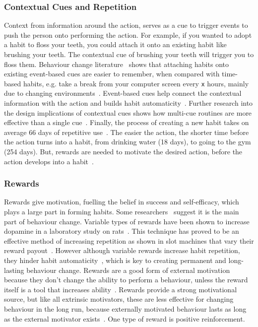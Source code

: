 \subsubsection*{Contextual Cues and Repetition}
Context from information around the action, serves as a cue to trigger events to push the person onto performing the action. For example, if you wanted to adopt a habit to floss your teeth, you could attach it onto an existing habit like brushing your teeth. The contextual cue of brushing your teeth will trigger you to floss them. Behaviour change literature~\cite{article_implementation_intentions_multicue} shows that attaching habits onto existing event-based cues are easier to remember, when compared with time-based habits, e.g. take a break from your computer screen every \verb|x| hours, mainly due to changing environments~\cite{coaching_not_that_good}. Event-based cues help connect the contextual information with the action and builds habit automaticity~\cite{article_implementation_intentions}. Further research into the design implications of contextual cues shows how multi-cue routines are more effective than a single cue~\cite{article_understanding_use_contextual_cues_design_impl}. Finally, the process of creating a new habit takes on average 66 days of repetitive use~\cite{article_how_habits_formed_modelling_habit_formation}. The easier the action, the shorter time before the action turns into a habit, from drinking water (18 days), to going to the gym (254 days). But, rewards are needed to motivate the desired action, before the action develops into a habit~\cite{habits_event_cues_1, habits_event_cues_2}.

\subsubsection*{Rewards}
Rewards give motivation, fuelling the belief in success and self-efficacy, which plays a large part in forming habits. Some researchers~\cite{article_a_self_efficacy} suggest it is the main part of behaviour change. Variable types of rewards have been shown to increase dopamine in a laboratory study on rats~\cite{variable_rewards_increases_dopamine}. This technique has proved to be an effective method of increasing repetition as shown in slot machines that vary their reward payout~\cite{programme_why_are_gambling_machines_addictive}. However although variable rewards increase habit repetition, they hinder habit automaticity~\cite{variable_rewards_increases_dopamine}, which is key to creating permanent and long-lasting behaviour change. Rewards are a good form of external motivation because they don't change the ability to perform a behaviour, unless the reward itself is a tool that increases ability~\cite{article_taxonomy_motivational_affordances_meaningful}. Rewards provide a strong motivational source, but like all extrinsic motivators, these are less effective for changing behaviour in the long run, because externally motivated behaviour lasts as long as the external motivator exists~\cite{article_beyond_self_tracking_designing_apps}. One type of reward is positive reinforcement.

